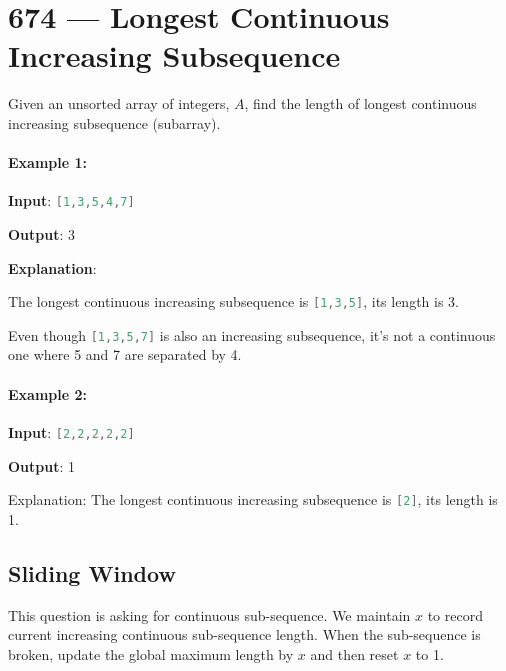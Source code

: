 \section{674 --- Longest Continuous Increasing Subsequence}
Given an unsorted array of integers, $A$, find the length of longest continuous increasing subsequence (subarray).

\paragraph{Example 1:}
\begin{flushleft}


\textbf{Input}: \lstinline[language=Java, basicstyle=\small\ttfamily, keywordstyle=\bfseries\color{green!40!black}]|[1,3,5,4,7]|

\textbf{Output}: 3

\textbf{Explanation}: 

The longest continuous increasing subsequence is \lstinline[language=Java, basicstyle=\small\ttfamily, keywordstyle=\bfseries\color{green!40!black}]|[1,3,5]|, its length is 3.
 
Even though \lstinline[language=Java, basicstyle=\small\ttfamily, keywordstyle=\bfseries\color{green!40!black}]|[1,3,5,7]| is also an increasing subsequence, it's not a continuous one where 5 and 7 are separated by 4. 
\end{flushleft}

\paragraph{Example 2:}

\begin{flushleft}
\textbf{Input}: \lstinline[language=Java, basicstyle=\small\ttfamily, keywordstyle=\bfseries\color{green!40!black}]|[2,2,2,2,2]|

\textbf{Output}: 1

Explanation: The longest continuous increasing subsequence is \lstinline[language=Java, basicstyle=\small\ttfamily, keywordstyle=\bfseries\color{green!40!black}]|[2]|, its length is 1. 
\end{flushleft}

\subsection{Sliding Window}
This question is asking for continuous sub-sequence. We maintain $x$ to record current increasing continuous sub-sequence length. When the sub-sequence is broken, update the global maximum length by $x$ and then reset $x$ to 1. 

